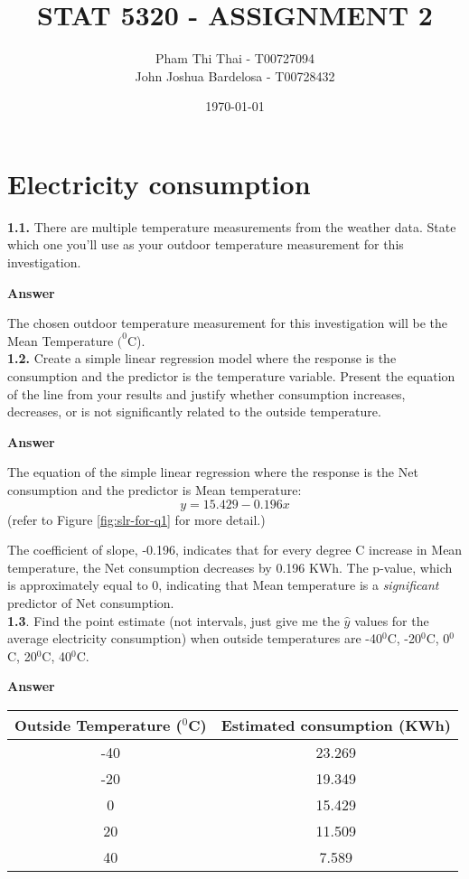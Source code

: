 \documentclass[12pt,doublespace]{article}
\begin{document}
	\title{ STAT 5320 - ASSIGNMENT 2}
	\author{Pham Thi Thai - T00727094
		\\
		John Joshua Bardelosa - T00728432}
	\date{\today}
	\maketitle
	\section {Electricity consumption}
	
	\textbf{1.1.} There are multiple temperature measurements from the weather data. State which one you’ll use as your outdoor temperature measurement for this investigation.
	
	\textbf{Answer}
	
	The chosen outdoor temperature measurement for this investigation will be the Mean Temperature $(^{0}$C).\\
	
	\textbf{1.2.} Create a simple linear regression model where the response is the consumption and the	predictor is the temperature variable. Present the equation of the line from your results	and justify whether consumption increases, decreases, or is not significantly related to the outside temperature.
	
	\textbf{Answer}
	
	The equation of the simple linear regression where the response is the Net consumption and the predictor is Mean temperature:
	$$y = 15.429 - 0.196 x$$ (refer to Figure \ref{fig:slr-for-q1} for more detail.)
	
	The coefficient of slope, -0.196, indicates that for every degree C increase in Mean temperature, the Net consumption decreases by 0.196 KWh. The p-value, which is approximately equal to 0, indicating that Mean temperature is a \textit{significant} predictor of Net consumption.\\
	
	\textbf{1.3}. Find the point estimate (not intervals, just give me the $\hat{y}$ values for the average electricity consumption) when outside temperatures are -40$^{0}$C, -20$^{0}$C, 0$^{0}$C, 20$^{0}$C, 40$^{0}$C.
	
	\textbf{Answer}
	
\begin{center}
		\begin{tabular}{|c|c|}
		\hline
		Outside Temperature ($^{0}$C) & Estimated consumption (KWh) \\
		\hline
		-40  & 23.269 \\
		\hline
		-20 & 19.349  \\
		\hline
		0 & 15.429 \\
		\hline
		20 & 11.509  \\
		\hline
		40 & 7.589 \\
		\hline
	\end{tabular}
\end{center}
	
\end{document}
